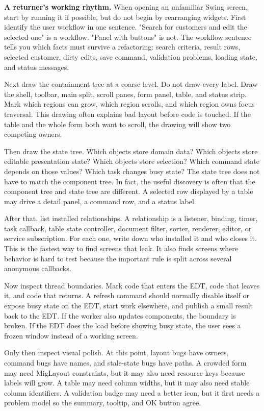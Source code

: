 \textbf{A returner's working rhythm.} When opening an unfamiliar Swing screen, start by running it if possible, but do not begin by rearranging widgets. First identify the user workflow in one sentence. "Search for customers and edit the selected one" is a workflow. "Panel with buttons" is not. The workflow sentence tells you which facts must survive a refactoring: search criteria, result rows, selected customer, dirty edits, save command, validation problems, loading state, and status messages.

Next draw the containment tree at a coarse level. Do not draw every label. Draw the shell, toolbar, main split, scroll panes, form panel, table, and status strip. Mark which regions can grow, which region scrolls, and which region owns focus traversal. This drawing often explains bad layout before code is touched. If the table and the whole form both want to scroll, the drawing will show two competing owners.

Then draw the state tree. Which objects store domain data? Which objects store editable presentation state? Which objects store selection? Which command state depends on those values? Which task changes busy state? The state tree does not have to match the component tree. In fact, the useful discovery is often that the component tree and state tree are different. A selected row displayed by a table may drive a detail panel, a command row, and a status label.

After that, list installed relationships. A relationship is a listener, binding, timer, task callback, table state controller, document filter, sorter, renderer, editor, or service subscription. For each one, write down who installed it and who closes it. This is the fastest way to find screens that leak. It also finds screens where behavior is hard to test because the important rule is split across several anonymous callbacks.

Now inspect thread boundaries. Mark code that enters the EDT, code that leaves it, and code that returns. A refresh command should normally disable itself or expose busy state on the EDT, start work elsewhere, and publish a small result back to the EDT. If the worker also updates components, the boundary is broken. If the EDT does the load before showing busy state, the user sees a frozen window instead of a working screen.

Only then inspect visual polish. At this point, layout bugs have owners, command bugs have names, and stale-state bugs have paths. A crowded form may need MigLayout constraints, but it may also need resource keys because labels will grow. A table may need column widths, but it may also need stable column identifiers. A validation badge may need a better icon, but it first needs a problem model so the summary, tooltip, and OK button agree.


